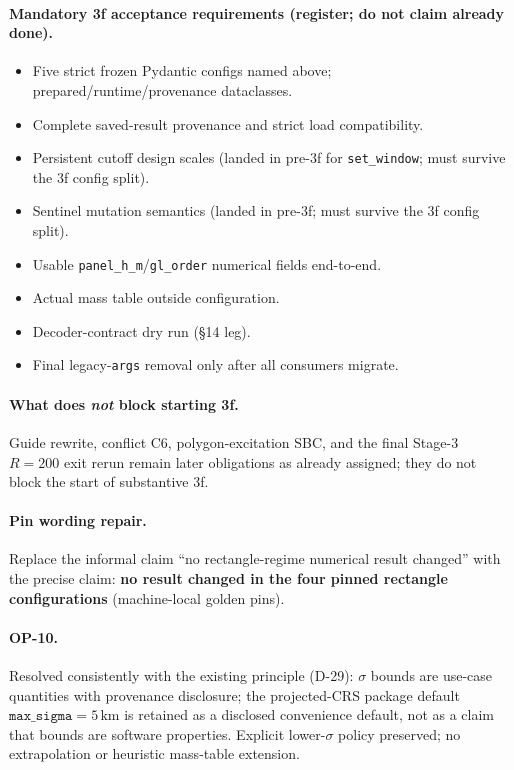 \documentclass[
  10pt,
]{article}
\providecommand{\tightlist}{%
  \setlength{\itemsep}{0pt}\setlength{\parskip}{0pt}}
\begin{document}
\paragraph{Mandatory 3f acceptance requirements (register; do not claim already done).}
\begin{itemize}
\tightlist
\item Five strict frozen Pydantic configs named above; prepared/runtime/provenance dataclasses.
\item Complete saved-result provenance and strict load compatibility.
\item Persistent cutoff design scales (landed in pre-3f for \texttt{set\_window}; must survive the 3f config split).
\item Sentinel mutation semantics (landed in pre-3f; must survive the 3f config split).
\item Usable \texttt{panel\_h\_m}/\texttt{gl\_order} numerical fields end-to-end.
\item Actual mass table outside configuration.
\item Decoder-contract dry run (§14 leg).
\item Final legacy-\texttt{args} removal only after all consumers migrate.
\end{itemize}

\paragraph{What does \emph{not} block starting 3f.}
Guide rewrite, conflict C6, polygon-excitation SBC, and the final Stage-3 \(R{=}200\) exit rerun remain later obligations as already assigned; they do not block the start of substantive 3f.

\paragraph{Pin wording repair.}
Replace the informal claim ``no rectangle-regime numerical result changed'' with the precise claim: \textbf{no result changed in the four pinned rectangle configurations} (machine-local golden pins).

\paragraph{OP-10.}
Resolved consistently with the existing principle (D-29): \(\sigma\) bounds are use-case quantities with provenance disclosure; the projected-CRS package default \(\texttt{max\_sigma}=5\,\mathrm{km}\) is retained as a disclosed convenience default, not as a claim that bounds are software properties. Explicit lower-\(\sigma\) policy preserved; no extrapolation or heuristic mass-table extension.
\end{document}
